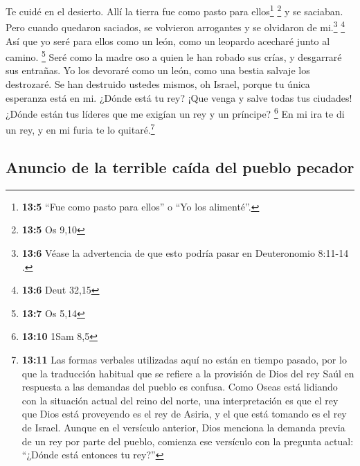  Te cuidé en el desierto. Allí la tierra fue como pasto
para ellos\footnote{\textbf{13:5} ``Fue como pasto para ellos'' o ``Yo
  los alimenté''.} \footnote{\textbf{13:5} Os 9,10}  y se
saciaban. Pero cuando quedaron saciados, se volvieron arrogantes y se
olvidaron de mi.\footnote{\textbf{13:6} Véase la advertencia de que esto
  podría pasar en Deuteronomio 8:11-14 .} \footnote{\textbf{13:6} Deut
  32,15}  Así que yo seré para ellos como un león, como un
leopardo acecharé junto al camino. \footnote{\textbf{13:7} Os 5,14}
 Seré como la madre oso a quien le han robado sus crías, y
desgarraré sus entrañas. Yo los devoraré como un león, como una bestia
salvaje los destrozaré.  Se han destruido ustedes mismos,
oh Israel, porque tu única esperanza está en mi.  ¿Dónde
está tu rey? ¡Que venga y salve todas tus ciudades! ¿Dónde están tus
líderes que me exigían un rey y un príncipe? \footnote{\textbf{13:10}
  1Sam 8,5}  En mi ira te di un rey, y en mi furia te lo
quitaré.\footnote{\textbf{13:11} Las formas verbales utilizadas aquí no
  están en tiempo pasado, por lo que la traducción habitual que se
  refiere a la provisión de Dios del rey Saúl en respuesta a las
  demandas del pueblo es confusa. Como Oseas está lidiando con la
  situación actual del reino del norte, una interpretación es que el rey
  que Dios está proveyendo es el rey de Asiria, y el que está tomando es
  el rey de Israel. Aunque en el versículo anterior, Dios menciona la
  demanda previa de un rey por parte del pueblo, comienza ese versículo
  con la pregunta actual: ``¿Dónde está entonces tu rey?''}

\hypertarget{anuncio-de-la-terrible-cauxedda-del-pueblo-pecador}{%
\subsection{Anuncio de la terrible caída del pueblo
pecador}\label{anuncio-de-la-terrible-cauxedda-del-pueblo-pecador}}

